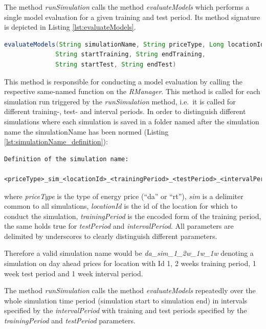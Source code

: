 The method \textit{runSimulation} calls the method \textit{evaluateModels} which performs a single model evaluation for a given training and test period. Its method signature is depicted in Listing \ref{lst:evaluateModels}. 

\begin{minipage}{\linewidth}
\begin{lstlisting}[language=Java, caption=Method evaluateModels, label={lst:evaluateModels}]
evaluateModels(String simulationName, String priceType, Long locationId, 
              String startTraining, String endTraining,
              String startTest, String endTest)
\end{lstlisting}
\end{minipage}

This method is responsible for conducting a model evaluation by calling the respective same-named function on the \textit{RManager}. This method is called for each simulation run triggered by the \textit{runSimulation} method, i.e.~it is called for different training-, test- and interval periods. In order to distinguish different simulations where each simulation is saved in a folder named after the simulation name the simulationName has been normed (Listing \ref{lst:simulationName_definition}): 

\begin{minipage}{\linewidth}
\begin{lstlisting}[caption=Definition of the simulation name, label={lst:simulationName_definition}]
Definition of the simulation name: 
	
<priceType>_sim_<locationId>_<trainingPeriod>_<testPeriod>_<intervalPeriod>
\end{lstlisting}
\end{minipage}

where \textit{priceType} is the type of energy price (``da'' or ``rt''), \textit{sim} is a delimiter common to all simulations, \textit{locationId} is the id of the location for which to conduct the simulation, \textit{trainingPeriod} is the encoded form of the training period, the same holds true for \textit{testPeriod} and \textit{intervalPeriod}. All parameters are delimited by underscores to clearly distinguish different parameters. 

Therefore a valid simulation name would be \textit{da\_sim\_1\_2w\_1w\_1w} denoting a simulation on day ahead prices for location with Id 1, 2 weeks training period, 1 week test period and 1 week interval period. 

The method \textit{runSimulation} calls the method \textit{evaluateModels} repeatedly over the whole simulation time period (simulation start to simulation end) in intervals specified by the \textit{intervalPeriod} with training and test periods specified by the \textit{trainingPeriod} and \textit{testPeriod} parameters. 

